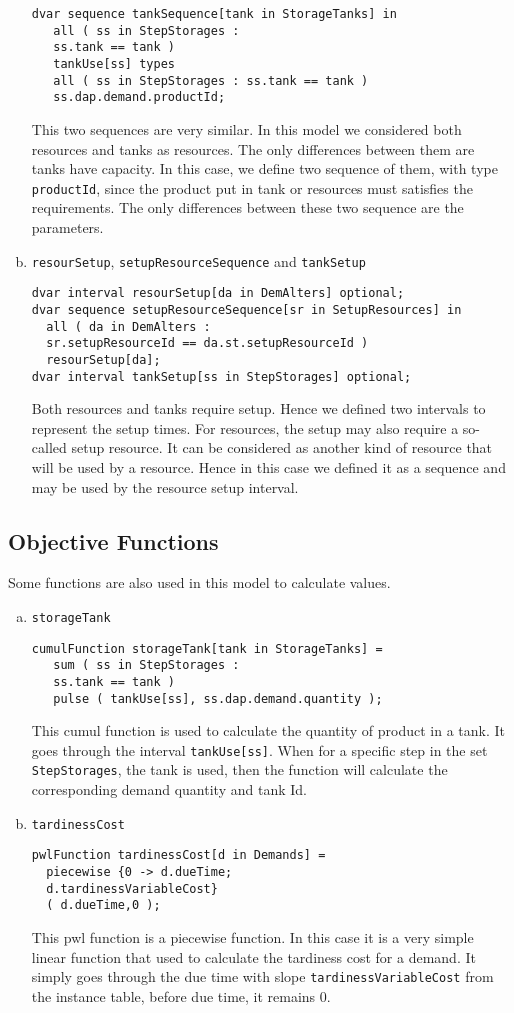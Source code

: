 \documentclass[a4paper, 12pt]{article}
\newcommand{\twoline}{\vspace{2ex}}
\begin{document}
\begin{enumerate}[a.~]
\begin{lstlisting}
dvar sequence tankSequence[tank in StorageTanks] in 
   all ( ss in StepStorages :
   ss.tank == tank ) 
   tankUse[ss] types 
   all ( ss in StepStorages : ss.tank == tank ) 
   ss.dap.demand.productId;
\end{lstlisting}
This two sequences are very similar. In this model we considered both resources and tanks as resources. The only differences between them are tanks have capacity. In this case, we define two sequence of them, with type \texttt{productId}, since the product put in tank or resources must satisfies the requirements. The only differences between these two sequence are the parameters. 
\item \texttt{resourSetup}, \texttt{setupResourceSequence} and \texttt{tankSetup}
\begin{lstlisting}
dvar interval resourSetup[da in DemAlters] optional;
dvar sequence setupResourceSequence[sr in SetupResources] in 
  all ( da in DemAlters : 
  sr.setupResourceId == da.st.setupResourceId )
  resourSetup[da];
dvar interval tankSetup[ss in StepStorages] optional;
\end{lstlisting}
Both resources and tanks require setup. Hence we defined two intervals to represent the setup times. For resources, the setup may also require a so-called setup resource. It can be considered as another kind of resource that will be used by a resource. Hence in this case we defined it as a sequence and may be used by the resource setup interval. 
\end{enumerate}

\subsection{Objective Functions}
\twoline 

Some functions are also used in this model to calculate values. 
\begin{enumerate}[a.~]
\item \texttt{storageTank}
\begin{lstlisting}
cumulFunction storageTank[tank in StorageTanks] = 
   sum ( ss in StepStorages :
   ss.tank == tank ) 
   pulse ( tankUse[ss], ss.dap.demand.quantity );
\end{lstlisting}
This cumul function is used to calculate the quantity of product in a tank. It goes through the interval \texttt{tankUse[ss]}. When for a specific step in the set \texttt{StepStorages}, the tank is used, then the function will calculate the corresponding demand quantity and tank Id. 
\item \texttt{tardinessCost}
\begin{lstlisting}
pwlFunction tardinessCost[d in Demands] = 
  piecewise {0 -> d.dueTime;
  d.tardinessVariableCost}
  ( d.dueTime,0 );
\end{lstlisting}
This pwl function is a piecewise function. In this case it is a very simple linear function that used to calculate the tardiness cost for a demand. It simply goes through the due time with slope \texttt{tardinessVariableCost} from the instance table, before due time, it remains 0. 
\end{enumerate}
\end{document}
